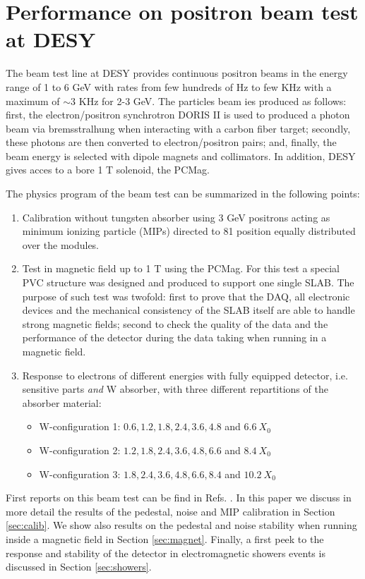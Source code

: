 \documentclass[a4paper,11pt]{article}
\begin{document}
\section{Performance on positron beam test at DESY}
\label{sec:beamtest}


The beam test line at DESY provides continuous positron beams in the energy range of 1 to 6 GeV with
rates from few hundreds of Hz to few KHz with a maximum of $\sim 3$ KHz for 2-3 GeV. 
The particles beam ies produced as follows: first, the electron/positron synchrotron DORIS II 
is used to produced a photon beam via bremsstralhung when interacting with a carbon fiber target;
secondly, these photons are then converted to electron/positron pairs; 
and, finally, the beam energy is selected with dipole magnets and collimators. 
In addition, DESY gives acces to a bore 1 T solenoid, the PCMag.

The physics program of the beam test can be summarized in the following points:

\begin{enumerate}
\item Calibration without tungsten absorber using 3 GeV positrons acting as minimum ionizing particle (MIPs) directed to 81 position equally distributed over the modules.
\item Test in magnetic field up to 1 T using the PCMag. For this test a special PVC structure was
designed and produced to support one single SLAB.	
The purpose of such test was twofold: first to prove that the DAQ, all electronic devices and the 
mechanical consistency of the SLAB itself are able
to handle strong magnetic fields; 
second to check the quality of the data and the performance of the detector during the data taking when running
in a magnetic field.
\item Response to electrons of different energies with fully equipped detector, i.e. sensitive parts {\it and} W absorber, with three different repartitions of the absorber material:
\begin{itemize}
\item W-configuration 1: $0.6,1.2,1.8,2.4,3.6,4.8$ and $6.6~X_{0}$
\item W-configuration 2: $1.2,1.8,2.4,3.6,4.8,6.6$ and $8.4~X_{0}$
\item W-configuration 3: $1.8,2.4,3.6,4.8,6.6,8.4$ and $10.2~X_{0}$
\end{itemize}
\end{enumerate}

First reports on this beam test can be find in
Refs. \cite{Irles:2018uum,Irles:2018hcd}. In this paper we discuss in more detail
the results of the pedestal, noise and MIP calibration in Section \ref{sec:calib}.
We show also results on the pedestal and noise stability when running inside
a magnetic field in Section \ref{sec:magnet}. Finally, a first peek to the 
response and stability of the detector in electromagnetic showers events is discussed in 
Section \ref{sec:showers}. 
\end{document}
